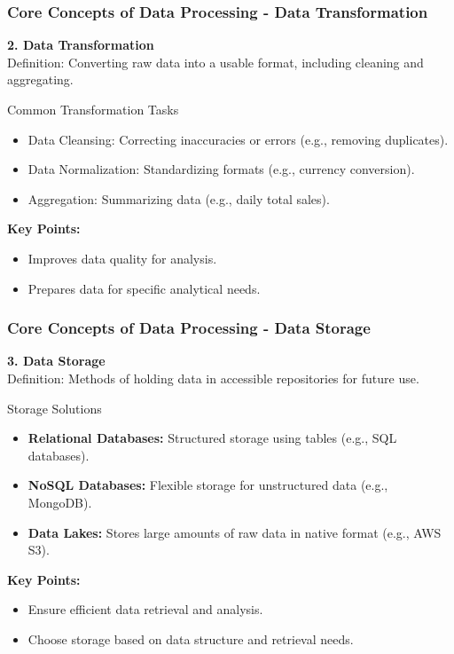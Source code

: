 \documentclass[aspectratio=169]{beamer}
\begin{document}
\begin{frame}[fragile]
    \frametitle{Core Concepts of Data Processing - Data Transformation}
    \textbf{2. Data Transformation} \\
    Definition: Converting raw data into a usable format, including cleaning and aggregating. 
    \begin{block}{Common Transformation Tasks}
        \begin{itemize}
            \item Data Cleansing: Correcting inaccuracies or errors (e.g., removing duplicates).
            \item Data Normalization: Standardizing formats (e.g., currency conversion).
            \item Aggregation: Summarizing data (e.g., daily total sales).
        \end{itemize}
    \end{block}
    \textbf{Key Points:}
    \begin{itemize}
        \item Improves data quality for analysis.
        \item Prepares data for specific analytical needs.
    \end{itemize}
\end{frame}

\begin{frame}[fragile]
    \frametitle{Core Concepts of Data Processing - Data Storage}
    \textbf{3. Data Storage} \\
    Definition: Methods of holding data in accessible repositories for future use. 
    \begin{block}{Storage Solutions}
        \begin{itemize}
            \item \textbf{Relational Databases:} Structured storage using tables (e.g., SQL databases).
            \item \textbf{NoSQL Databases:} Flexible storage for unstructured data (e.g., MongoDB).
            \item \textbf{Data Lakes:} Stores large amounts of raw data in native format (e.g., AWS S3).
        \end{itemize}
    \end{block}
    \textbf{Key Points:}
    \begin{itemize}
        \item Ensure efficient data retrieval and analysis.
        \item Choose storage based on data structure and retrieval needs.
    \end{itemize}
\end{frame}
\end{document}
